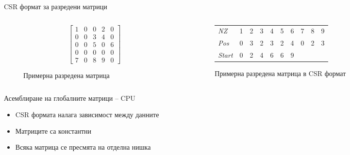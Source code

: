 \documentclass{beamer}
\begin{document}
\iftrue
\begin{frame}{CSR формат за разредени матрици}

\begin{columns} 
    \begin{column}{.3\textwidth}
    \begin{figure}[H]
$$
\begin{bmatrix}
	1 & 0 & 0 & 2 & 0\\
	0 & 0 & 3 & 4 & 0\\
	0 & 0 & 5 & 0 & 6\\
	0 & 0 & 0 & 0 & 0\\
	7 & 0 & 8 & 9 & 0
\end{bmatrix}
$$
\caption{Примерна разредена матрица}
\end{figure}
    \end{column}
    \begin{column}{.7\textwidth}
    \begin{figure}[H]
\centering
\begin{tabular}{l|ccccccccc}
\cline{2-10}
\textit{NZ}    & 1 & 2 & 3 & 4 & 5 & 6                      & 7 & 8 & \multicolumn{1}{c|}{9} \\ \cline{2-10}
\textit{Pos}   & 0 & 3 & 2 & 3 & 2 & 4                      & 0 & 2 & \multicolumn{1}{c|}{3} \\ \cline{2-10}
\textit{Start} & 0 & 2 & 4 & 6 & 6 & \multicolumn{1}{c|}{9} &   &   &                        \\ \cline{2-7}
\end{tabular}
\caption{Примерна разредена матрица в CSR формат}
\end{figure}
    \end{column}%
\end{columns}

\end{frame}
\fi






\begin{frame}{Асемблиране на глобалните матрици -- CPU}
	\begin{itemize}[<+->]
		\item CSR формата налага зависимост между данните
		\item Матриците са константни
		\item Всяка матрица се пресмята на отделна нишка
	\end{itemize}
\end{frame}
\end{document}
